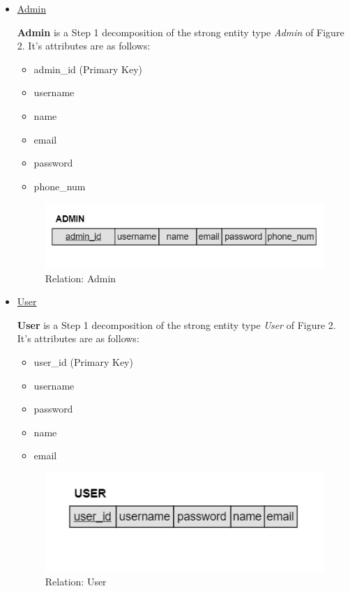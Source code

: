 \documentclass[12pt,a4paper]{report}
\begin{document}
\begin{itemize}
\item \underline{Admin} \par
\textbf{Admin} is a Step 1 decomposition of the strong entity type \textit{Admin} of Figure 2. It's attributes are as follows:
\begin{itemize}
\item admin\_id (Primary Key)
\item username 
\item name
\item email
\item password
\item phone\_num
\end{itemize}
\begin{figure}[H]
\centering
\includegraphics[scale=1.0]{admin.png}
\caption{Relation: Admin}
\label{Figure:admin}
\end{figure}  

\item \underline{User} \par 
\textbf{User} is a Step 1 decomposition of the strong entity type \textit{User} of Figure 2. It's attributes are as follows:
\begin{itemize}
\item user\_id (Primary Key)
\item username 
\item password
\item name
\item email
\end{itemize}
\begin{figure}[H]
\centering
\includegraphics[scale=1.0]{user.png}
\caption{Relation: User}
\label{Figure:user}
\end{figure}  


\end{itemize}
\end{document}
